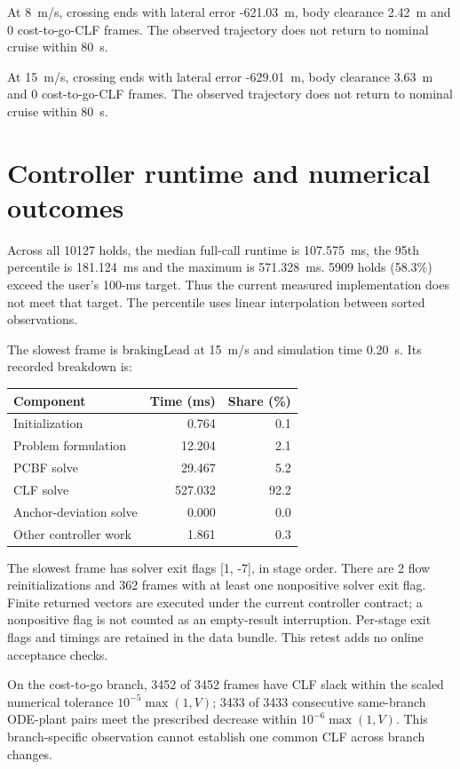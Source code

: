 \documentclass[11pt]{article}
\begin{document}
At 8~m/s, crossing ends with lateral error -621.03~m, body clearance 2.42~m and 0 cost-to-go-CLF frames. The observed trajectory does not return to nominal cruise within 80~s.

At 15~m/s, crossing ends with lateral error -629.01~m, body clearance 3.63~m and 0 cost-to-go-CLF frames. The observed trajectory does not return to nominal cruise within 80~s.

\section{Controller runtime and numerical outcomes}
Across all 10127 holds, the median full-call runtime is 107.575~ms,
the 95th percentile is 181.124~ms and the maximum is 571.328~ms.
5909 holds (58.3\%) exceed the user's 100-ms target. Thus the
current measured implementation does not meet that target.
The percentile uses linear interpolation between sorted observations.

The slowest frame is brakingLead at 15~m/s and simulation time 0.20~s.
Its recorded breakdown is:
\begin{center}
\begin{tabular}{lrr}
\toprule
Component & Time (ms) & Share (\%)\\
\midrule
Initialization & 0.764 & 0.1 \\
Problem formulation & 12.204 & 2.1 \\
PCBF solve & 29.467 & 5.2 \\
CLF solve & 527.032 & 92.2 \\
Anchor-deviation solve & 0.000 & 0.0 \\
Other controller work & 1.861 & 0.3 \\
\bottomrule
\end{tabular}
\end{center}
The slowest frame has solver exit flags [1, -7], in stage order.
There are 2 flow reinitializations and 362 frames with at
least one nonpositive solver exit flag. Finite returned vectors are executed
under the current controller contract; a nonpositive flag is not counted as
an empty-result interruption. Per-stage exit flags and timings are retained
in the data bundle. This retest adds no online acceptance checks.

On the cost-to-go branch, 3452 of 3452 frames have CLF slack within the
scaled numerical tolerance $10^{-5}\max(1,V)$; 3433 of 3433 consecutive
same-branch ODE-plant pairs meet the prescribed decrease within
$10^{-6}\max(1,V)$. This branch-specific observation cannot establish one
common CLF across branch changes.
\end{document}
